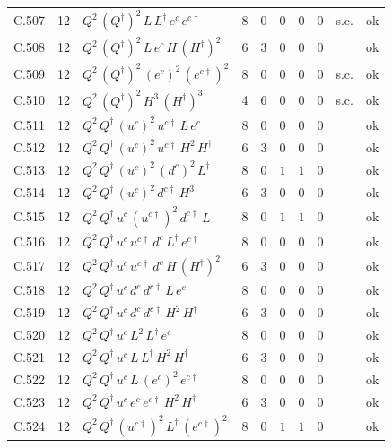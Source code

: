 {\begin{longtable}{@{}ll>{\raggedright\arraybackslash}p{6.4cm}rrllllr@{}}
C.507 & 12 & $Q^{2}\,(Q^\dagger)^{2}\,L\,L^\dagger\,e^c\,e^{c\dagger}$ & 8 & 0 & $0$ & $0$ & $0$ & s.c. & ok \\
C.508 & 12 & $Q^{2}\,(Q^\dagger)^{2}\,L\,e^c\,H\,(H^\dagger)^{2}$ & 6 & 3 & $0$ & $0$ & $0$ &  & ok \\
C.509 & 12 & $Q^{2}\,(Q^\dagger)^{2}\,(e^c)^{2}\,(e^{c\dagger})^{2}$ & 8 & 0 & $0$ & $0$ & $0$ & s.c. & ok \\
C.510 & 12 & $Q^{2}\,(Q^\dagger)^{2}\,H^{3}\,(H^\dagger)^{3}$ & 4 & 6 & $0$ & $0$ & $0$ & s.c. & ok \\
C.511 & 12 & $Q^{2}\,Q^\dagger\,(u^c)^{2}\,u^{c\dagger}\,L\,e^c$ & 8 & 0 & $0$ & $0$ & $0$ &  & ok \\
C.512 & 12 & $Q^{2}\,Q^\dagger\,(u^c)^{2}\,u^{c\dagger}\,H^{2}\,H^\dagger$ & 6 & 3 & $0$ & $0$ & $0$ &  & ok \\
C.513 & 12 & $Q^{2}\,Q^\dagger\,(u^c)^{2}\,(d^c)^{2}\,L^\dagger$ & 8 & 0 & $1$ & $1$ & $0$ &  & ok \\
C.514 & 12 & $Q^{2}\,Q^\dagger\,(u^c)^{2}\,d^{c\dagger}\,H^{3}$ & 6 & 3 & $0$ & $0$ & $0$ &  & ok \\
C.515 & 12 & $Q^{2}\,Q^\dagger\,u^c\,(u^{c\dagger})^{2}\,d^{c\dagger}\,L$ & 8 & 0 & $1$ & $1$ & $0$ &  & ok \\
C.516 & 12 & $Q^{2}\,Q^\dagger\,u^c\,u^{c\dagger}\,d^c\,L^\dagger\,e^{c\dagger}$ & 8 & 0 & $0$ & $0$ & $0$ &  & ok \\
C.517 & 12 & $Q^{2}\,Q^\dagger\,u^c\,u^{c\dagger}\,d^c\,H\,(H^\dagger)^{2}$ & 6 & 3 & $0$ & $0$ & $0$ &  & ok \\
C.518 & 12 & $Q^{2}\,Q^\dagger\,u^c\,d^c\,d^{c\dagger}\,L\,e^c$ & 8 & 0 & $0$ & $0$ & $0$ &  & ok \\
C.519 & 12 & $Q^{2}\,Q^\dagger\,u^c\,d^c\,d^{c\dagger}\,H^{2}\,H^\dagger$ & 6 & 3 & $0$ & $0$ & $0$ &  & ok \\
C.520 & 12 & $Q^{2}\,Q^\dagger\,u^c\,L^{2}\,L^\dagger\,e^c$ & 8 & 0 & $0$ & $0$ & $0$ &  & ok \\
C.521 & 12 & $Q^{2}\,Q^\dagger\,u^c\,L\,L^\dagger\,H^{2}\,H^\dagger$ & 6 & 3 & $0$ & $0$ & $0$ &  & ok \\
C.522 & 12 & $Q^{2}\,Q^\dagger\,u^c\,L\,(e^c)^{2}\,e^{c\dagger}$ & 8 & 0 & $0$ & $0$ & $0$ &  & ok \\
C.523 & 12 & $Q^{2}\,Q^\dagger\,u^c\,e^c\,e^{c\dagger}\,H^{2}\,H^\dagger$ & 6 & 3 & $0$ & $0$ & $0$ &  & ok \\
C.524 & 12 & $Q^{2}\,Q^\dagger\,(u^{c\dagger})^{2}\,L^\dagger\,(e^{c\dagger})^{2}$ & 8 & 0 & $1$ & $1$ & $0$ &  & ok \\

\end{longtable}}
